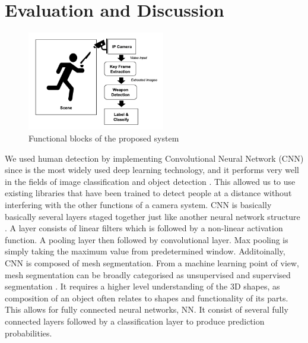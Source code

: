 \section{Evaluation and Discussion}

\begin{figure}
    \centering
    \includegraphics[width=6cm]{Security Object Detection, Surveillance/Latex/figures/fig5.png}
    \caption{Functional blocks of the proposed system \cite{Xu}}
    \label{fig:fig5}
\end{figure}

We used human detection by implementing Convolutional Neural Network (CNN) since is the most widely used deep learning technology, and it performs very well in the fields of image classification and object detection \cite{Xie}. This allowed us to use existing libraries that have been trained to detect people at a distance without interfering with the other functions of a camera system. CNN is basically basically several layers staged together just like another neural network structure \cite{Dinama}. A layer consists of linear filters which is followed by a non-linear activation function. A pooling layer then followed by convolutional layer. Max pooling is simply taking the maximum value from predetermined window. Additoinally, CNN is composed of mesh segmentation. From a machine learning  point of view, mesh segmentation can be broadly categorised as unsupervised and supervised segmentation \cite{George}. It requires a higher level understanding of the 3D
shapes, as composition of an object often relates to shapes and functionality of its parts. This allows for fully connected neural networks, NN. It consist of several fully
connected layers followed by a classification layer to produce prediction
probabilities. 

